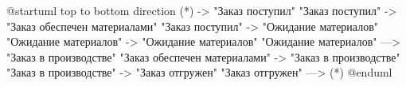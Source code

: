 @startuml 
top to bottom direction 
(*) -> "Заказ поступил" 
"Заказ поступил" -> "Заказ обеспечен материалами" 
"Заказ поступил" -> "Ожидание материалов" 
"Ожидание материалов" -> "Ожидание материалов" 
"Ожидание материалов" —> "Заказ в производстве" 
"Заказ обеспечен материалами" -> "Заказ в производстве" 
"Заказ в производстве" -> "Заказ отгружен" 
"Заказ отгружен" —> (*) 
@enduml